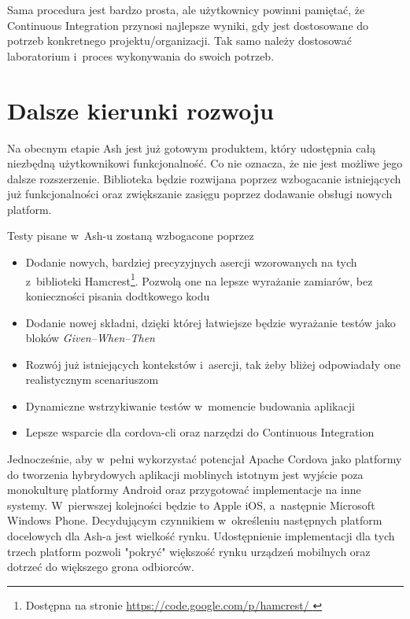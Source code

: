 \documentclass[brudnopis]{xmgr}
\begin{document}
Sama procedura jest bardzo prosta, ale użytkownicy powinni pamiętać, że Continuous Integration przynosi najlepsze wyniki, gdy jest dostosowane do potrzeb konkretnego projektu/organizacji. Tak samo należy dostosować laboratorium i~proces wykonywania do swoich potrzeb. 

\chapter{Dalsze kierunki rozwoju}

Na obecnym etapie Ash jest już gotowym produktem, który udostępnia całą niezbędną użytkownikowi funkcjonalność. Co nie oznacza, że nie jest możliwe jego dalsze rozszerzenie. Biblioteka będzie rozwijana poprzez wzbogacanie istniejących już funkcjonalności oraz zwiększanie zasięgu poprzez dodawanie obsługi nowych platform. 

Testy pisane w~Ash-u zostaną wzbogacone poprzez

\begin{itemize}
  \item Dodanie nowych, bardziej precyzyjnych asercji wzorowanych na tych z~biblioteki Hamcrest\footnote{Dostępna na stronie \url{https://code.google.com/p/hamcrest/ } }. Pozwolą one na lepsze wyrażanie zamiarów, bez konieczności pisania dodtkowego kodu
  \item Dodanie nowej składni, dzięki której łatwiejsze będzie wyrażanie testów jako bloków \textit{Given--When--Then}
  \item Rozwój już istniejących kontekstów i~asercji, tak żeby bliżej odpowiadały one realistycznym scenariuszom 
  \item Dynamiczne wstrzykiwanie testów w~momencie budowania aplikacji
  \item Lepsze wsparcie dla cordova-cli oraz narzędzi do Continuous Integration
\end{itemize}

Jednocześnie, aby w~pełni wykorzystać potencjał Apache Cordova jako platformy do tworzenia hybrydowych aplikacji moblinych istotnym jest wyjście poza monokulturę platformy Android oraz przygotować implementacje na inne systemy. W~pierwszej kolejności będzie to Apple iOS, a~następnie Microsoft Windows Phone. Decydującym czynnikiem w~określeniu następnych platform docelowych dla Ash-a jest wielkość rynku. Udostępnienie implementacji dla tych trzech platform pozwoli "pokryć" większość rynku urządzeń mobilnych oraz dotrzeć do większego grona odbiorców. 

\summary
\end{document}
